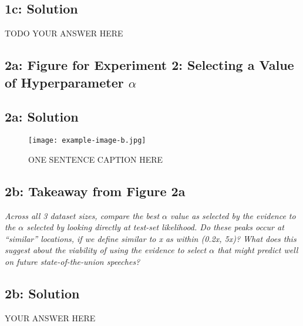 \documentclass[12pt]{article}
\newcommand{\officialdirections}[1]{{\color{purple} #1}}
\begin{document}
\subsection{1c: Solution}

TODO YOUR ANSWER HERE

\newpage 
\officialdirections{
\subsection*{2a: Figure for Experiment 2: Selecting a Value of Hyperparameter $\alpha$}
}

\subsection{2a: Solution}

\begin{figure}[!h]
     \centering
     \texttt{[image: example-image-b.jpg]} %
     \caption{ONE SENTENCE CAPTION HERE}
     \label{fig:fig1a}
\end{figure}

\officialdirections{
\subsection*{2b: Takeaway from Figure 2a}
\emph{\large 
Across all 3 dataset sizes, compare the best $\alpha$ value as selected by the evidence to the $\alpha$ selected by looking directly at test-set likelihood. Do these peaks occur at ``similar'' locations, if we define similar to x as within (0.2x, 5x)? What does this suggest about the viability of using the evidence to select $\alpha$ that might predict well on future state-of-the-union speeches?
}}

\subsection{2b: Solution}

YOUR ANSWER HERE
\end{document}
